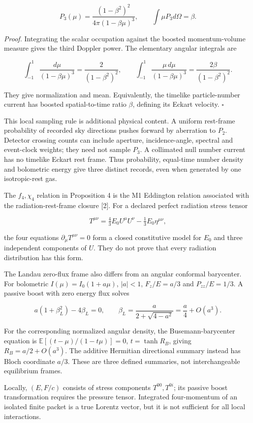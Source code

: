 \documentclass[
  11pt,
  a4paper,
]{article}
\begin{document}
\[P_3(\mu)=\frac{(1-\beta^2)^2}{4\pi(1-\beta\mu)^3},\qquad
\int\mu P_3d\Omega=\beta.\]

\emph{Proof.} Integrating the scalar occupation against the boosted momentum-volume measure gives the third Doppler power. The elementary angular integrals are

\[\int_{-1}^1\frac{d\mu}{(1-\beta\mu)^3}=\frac2{(1-\beta^2)^2},\qquad
\int_{-1}^1\frac{\mu\,d\mu}{(1-\beta\mu)^3}=\frac{2\beta}{(1-\beta^2)^2}.\]

They give normalization and mean. Equivalently, the timelike particle-number current has boosted spatial-to-time ratio \(\beta\), defining its Eckart velocity. \(\square\)

This local sampling rule is additional physical content. A uniform rest-frame probability of recorded sky directions pushes forward by aberration to \(P_2\). Detector crossing counts can include aperture, incidence-angle, spectral and event-clock weights; they need not sample \(P_3\). A collimated null number current has no timelike Eckart rest frame. Thus probability, equal-time number density and bolometric energy give three distinct records, even when generated by one isotropic-rest gas.

The \(f_4,\chi_4\) relation in Proposition 4 is the M1 Eddington relation associated with the radiation-rest-frame closure {[}2{]}. For a declared perfect radiation stress tensor

\[T^{\mu\nu}=\tfrac43E_0U^\mu U^\nu-\tfrac13E_0\eta^{\mu\nu},\]

the four equations \(\partial_\mu T^{\mu\nu}=0\) form a closed constitutive model for \(E_0\) and three independent components of \(U\). They do not prove that every radiation distribution has this form.

The Landau zero-flux frame also differs from an angular conformal barycenter. For bolometric \(I(\mu)=I_0(1+a\mu)\), \(|a|<1\), \(F_z/E=a/3\) and \(P_{zz}/E=1/3\). A passive boost with zero energy flux solves

\[a(1+\beta_L^2)-4\beta_L=0,\qquad
\beta_L=\frac{a}{2+\sqrt{4-a^2}}=\frac a4+O(a^3).\]

For the corresponding normalized angular density, the Busemann-barycenter equation is \(\mathbb E[(t-\mu)/(1-t\mu)]=0\), \(t=\tanh R_B\), giving \(R_B=a/2+O(a^3)\). The additive Hermitian directional summary instead has Bloch coordinate \(a/3\). These are three defined summaries, not interchangeable equilibrium frames.

Locally, \((E,F/c)\) consists of stress components \(T^{00},T^{0i}\); its passive boost transformation requires the pressure tensor. Integrated four-momentum of an isolated finite packet is a true Lorentz vector, but it is not sufficient for all local interactions.
\end{document}
